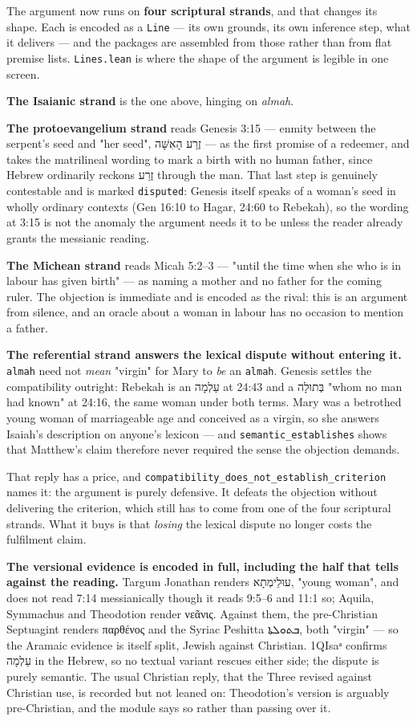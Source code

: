 \documentclass[11pt]{article}
\begin{document}
The argument now runs on \textbf{four scriptural strands}, and that changes its shape. Each is encoded as a \texttt{Line} — its own grounds, its own inference step, what it delivers — and the packages are assembled from those rather than from flat premise lists. \texttt{Lines.lean} is where the shape of the argument is legible in one screen.

\textbf{The Isaianic strand} is the one above, hinging on \emph{almah}.

\textbf{The protoevangelium strand} reads Genesis 3:15 — enmity between the serpent's seed and "her seed", זֶרַע הָאִשָּׁה — as the first promise of a redeemer, and takes the matrilineal wording to mark a birth with no human father, since Hebrew ordinarily reckons זֶרַע through the man. That last step is genuinely contestable and is marked \texttt{disputed}: Genesis itself speaks of a woman's seed in wholly ordinary contexts (Gen 16:10 to Hagar, 24:60 to Rebekah), so the wording at 3:15 is not the anomaly the argument needs it to be unless the reader already grants the messianic reading.

\textbf{The Michean strand} reads Micah 5:2–3 — "until the time when she who is in labour has given birth" — as naming a mother and no father for the coming ruler. The objection is immediate and is encoded as the rival: this is an argument from silence, and an oracle about a woman in labour has no occasion to mention a father.

\textbf{The referential strand answers the lexical dispute without entering it.} \texttt{almah} need not \emph{mean} "virgin" for Mary to \emph{be} an \texttt{almah}. Genesis settles the compatibility outright: Rebekah is an עַלְמָה at 24:43 and a בְּתוּלָה "whom no man had known" at 24:16, the same woman under both terms. Mary was a betrothed young woman of marriageable age and conceived as a virgin, so she answers Isaiah's description on anyone's lexicon — and \texttt{semantic\_\allowbreak{}establishes} shows that Matthew's claim therefore never required the sense the objection demands.

That reply has a price, and \texttt{compatibility\_\allowbreak{}does\_\allowbreak{}not\_\allowbreak{}establish\_\allowbreak{}criterion} names it: the argument is purely defensive. It defeats the objection without delivering the criterion, which still has to come from one of the four scriptural strands. What it buys is that \emph{losing} the lexical dispute no longer costs the fulfilment claim.

\textbf{The versional evidence is encoded in full, including the half that tells against the reading.} Targum Jonathan renders עוּלֵימְתָא, "young woman", and does not read 7:14 messianically though it reads 9:5–6 and 11:1 so; Aquila, Symmachus and Theodotion render νεᾶνις. Against them, the pre-Christian Septuagint renders παρθένος and the Syriac Peshitta ܒܬܘܠܬܐ, both "virgin" — so the Aramaic evidence is itself split, Jewish against Christian. 1QIsaᵃ confirms עַלְמָה in the Hebrew, so no textual variant rescues either side; the dispute is purely semantic. The usual Christian reply, that the Three revised against Christian use, is recorded but not leaned on: Theodotion's version is arguably pre-Christian, and the module says so rather than passing over it.
\end{document}
